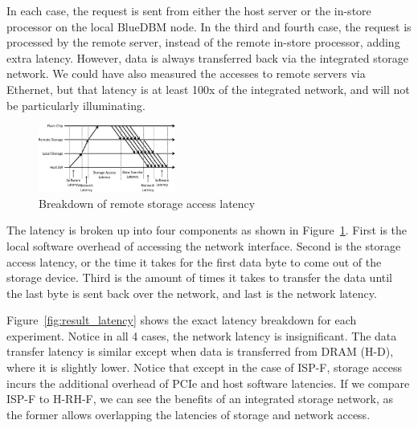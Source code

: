 In each case, the request is sent from either the host server or the in-store processor on the local BlueDBM node. In the third and fourth case, the request is processed by the remote server, instead of the remote in-store processor, adding extra latency. However, data is always transferred back via the integrated storage network. We could have also measured the accesses to remote servers via Ethernet, but that latency is at least 100x of the integrated network, and will not be particularly illuminating.

\begin{figure}[b]
	\centering
	\includegraphics[width=0.40\textwidth]{figures/latencybreak-crop.pdf}
	\caption{Breakdown of remote storage access latency}
	\label{fig:latencybreak}
\end{figure}

The latency is broken up into four components as shown in Figure~\ref{fig:latencybreak}. First is the local software overhead of accessing the network
interface. Second is the storage access latency, or the time it takes for the
first data byte to come out of the storage device. Third is the amount of times
it takes to transfer the data until the last byte is sent back over the network,
and last is the network latency.

Figure~\ref{fig:result_latency} shows the exact latency breakdown for each experiment. Notice in all 4 cases, the network latency is insignificant. The data transfer latency is similar except when data is transferred from DRAM (H-D), where it is slightly lower. Notice that except in the case of ISP-F, storage access incurs the additional overhead of PCIe and host software latencies. If we compare ISP-F to H-RH-F, we can see the benefits of an integrated storage network, as the former allows overlapping the latencies of storage and network access. 

%
%



